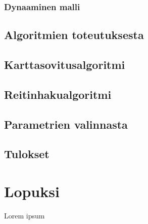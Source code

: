 \documentclass[
  12pt,
  a4paper, twoside]{book}
\theoremstyle{definition}
\theoremstyle{definition}
\theoremstyle{definition}
\theoremstyle{definition}
\theoremstyle{remark}
\begin{document}
\hypertarget{dynaaminen-malli}{%
\subsection{Dynaaminen malli}\label{dynaaminen-malli}}

\hypertarget{algoritmien-toteutuksesta}{%
\section{Algoritmien toteutuksesta}\label{algoritmien-toteutuksesta}}

\hypertarget{karttasovitusalgoritmi}{%
\section{Karttasovitusalgoritmi}\label{karttasovitusalgoritmi}}

\hypertarget{reitinhakualgoritmi}{%
\section{Reitinhakualgoritmi}\label{reitinhakualgoritmi}}

\hypertarget{parametrien-valinnasta}{%
\section{Parametrien valinnasta}\label{parametrien-valinnasta}}

\hypertarget{tulokset}{%
\section{Tulokset}\label{tulokset}}

\hypertarget{lopuksi}{%
\chapter{Lopuksi}\label{lopuksi}}

Lorem ipsum

  
\end{document}
